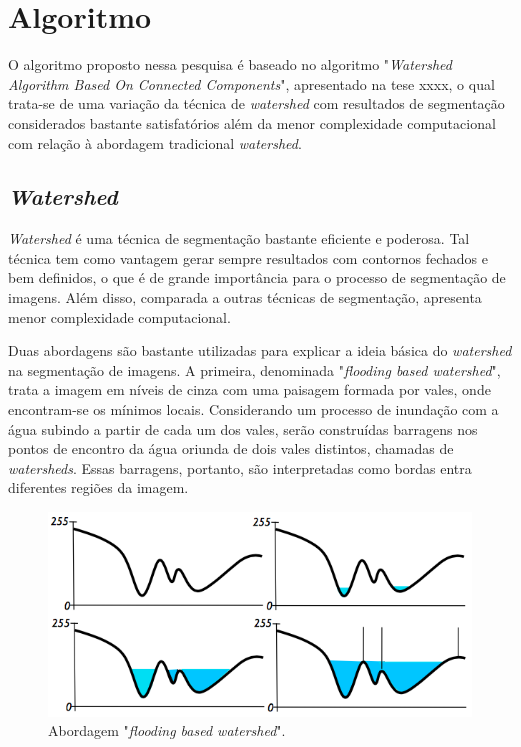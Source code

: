 \chapter{Algoritmo}\label{cap:algoritmo}

O algoritmo proposto nessa pesquisa é baseado no algoritmo "\textit{Watershed Algorithm Based On Connected Components}", apresentado na tese xxxx, o qual trata-se de uma variação da técnica de \textit{watershed} com resultados de segmentação considerados bastante satisfatórios além da menor complexidade computacional com relação à abordagem tradicional \textit{watershed}.

\section{\textit{Watershed}}\label{sec:watershed}
\textit{Watershed} é uma técnica de segmentação bastante eficiente e poderosa. Tal técnica tem como vantagem gerar sempre resultados com contornos fechados e bem definidos, o que é de grande importância para o processo de segmentação de imagens. Além disso, comparada a outras técnicas de segmentação, apresenta menor complexidade computacional.

Duas abordagens são bastante utilizadas para explicar a ideia básica do \textit{watershed} na segmentação de imagens. 
A primeira, denominada "\textit{flooding based watershed}", trata a imagem em níveis de cinza com uma paisagem formada por vales, onde encontram-se os mínimos locais. Considerando um processo de inundação com a água subindo a partir de cada um dos vales, serão construídas barragens nos pontos de encontro da água oriunda de dois vales distintos, chamadas de \textit{watersheds}. Essas barragens, portanto, são interpretadas como bordas entra diferentes regiões da imagem. 

	\begin{figure}[!htb]
       \begin{center}  
          \includegraphics[width=0.8\columnwidth]{img/abordagem_flooding.jpg}
           \caption{\label{fig:abordagem_flooding}Abordagem "\textit{flooding based watershed}".}
       \end{center}
   \end{figure} 


